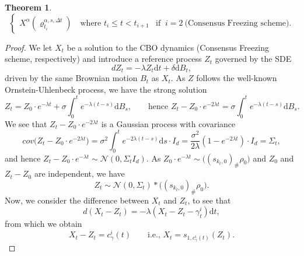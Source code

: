 \documentclass[reqno]{amsart}
\numberwithin{algorithm}{section}
\newcommand{\diff}{\mathrm{d}}
\newcommand{\Xalpha}{{X^\alpha}}
\newcommand{\mc}[1]{\mathcal{#1}}
\newtheorem{theorem}{Theorem}[section]
\begin{document}
{\begin{theorem}
\begin{equation*}
\begin{cases}
                \Xalpha(\varrho_{t_i}^{\alpha,s,\Delta t}) \quad \text{where } t_i \leq t < t_{i+1} & \text{if }\ i=2\ 
                \text{(Consensus Freezing scheme)}.
            \end{cases}
        \end{equation*}
   \end{theorem}
    \begin{proof}
        We let $X_t$ be a solution to the CBO dynamics (Consensus Freezing scheme, respectively) and introduce a reference process $Z_t$ governed by the SDE
        \begin{equation*}
            dZ_t = -\lambda Z_t \diff t + \delta \diff B_t,
        \end{equation*}
        driven by the same Brownian motion $B_t$ as $X_t$. As $Z$ follows the well-known Ornstein-Uhlenbeck process, we have the strong solution
        \begin{equation*}
            Z_t = Z_0 \cdot e^{-\lambda t} + \sigma \int_0^{t}e^{-\lambda (t -s)}\diff B_s, \qquad \text{hence }
            Z_t - Z_0 \cdot e^{-2\lambda t} = \sigma \int_0^{t}e^{-\lambda (t -s)}\diff B_s.
        \end{equation*}
        We see that $Z_t - Z_0 \cdot e^{-2\lambda t}$ is a Gaussian process with covariance
        \begin{equation*}
            cov\big(Z_t - Z_0 \cdot e^{-2\lambda t}\big) = \sigma^2 \int_0^{t} e^{-2\lambda (t - s)} \diff s \cdot I_d = \frac{\sigma^2}{2\lambda} (1 - e^{-2\lambda t}) \cdot I_d = \Sigma_t,
        \end{equation*}
        and hence $Z_t - Z_0 \cdot e^{-\lambda t} \sim \mc{N}(0, \Sigma_t I_d)$. 
        As $Z_0 \cdot e^{-\lambda t} \sim \big((s_{k_t,0})_\# \rho_0\big)$ and $Z_0$ and $Z_t - Z_0$ are independent, we have
        \begin{equation*}
            Z_t \sim \mc{N}(0, \Sigma_t) \ast \Big((s_{k_t,0})_\# \rho_0\Big).
        \end{equation*}
        Now, we consider the difference between $X_t$ and $Z_t$, to see that
        \begin{equation*}
            d(X_t - Z_t) = -\lambda (X_t - Z_t - \gamma_t^i) \diff t,
        \end{equation*}
        from which we obtain
        \begin{equation*}
            X_t - Z_t = c^i_\gamma(t) \qquad \text{i.e., } X_t = s_{1, c^i_\gamma(t)}(Z_t).
        \end{equation*}

\end{proof}}
\end{document}
